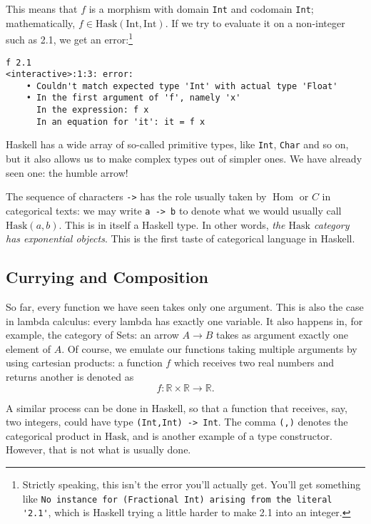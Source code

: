 \documentclass[11pt]{article}
\theoremstyle{nonumberplain}
\newcommand{\R}{\mathbb{R}}
\newcommand{\Hask}{\mathrm{Hask}}
\newcommand{\type}[1]{\mathrm{#1}}
\newcommand{\cat}[1]{\mathrm{#1}}
\DeclareMathOperator{\Hom}{Hom}
\newcommand*\lsin{\lstinline}
\begin{document}
This means that $f$ is a morphism with domain \lstinline|Int| and codomain \lstinline|Int|; mathematically, $f \in \Hask(\type{Int}, \type{Int})$. If we try to evaluate it on a non-integer such as 2.1, we get an error:\footnote{Strictly speaking, this isn't the error you'll actually get. You'll get something like \lstinline|No instance for (Fractional Int) arising from the literal '2.1'|, which is Haskell trying a little harder to make 2.1 into an integer.}
\begin{lstlisting}
f 2.1
<interactive>:1:3: error:
    • Couldn't match expected type 'Int' with actual type 'Float'
    • In the first argument of 'f', namely 'x'
      In the expression: f x
      In an equation for 'it': it = f x
\end{lstlisting}

Haskell has a wide array of so-called primitive types, like \lstinline|Int|, \lstinline|Char| and so on, but it also allows us to make complex types out of simpler ones. We have already seen one: the humble arrow!

The sequence of characters \lstinline|->| has the role usually taken by $\Hom$ or $C$ in categorical texts: we may write \lsin|a -> b| to denote what we would usually call $\Hask(a,b)$. This is in itself a Haskell type. In other words, \emph{the $\Hask$ category has exponential objects}. This is the first taste of categorical language in Haskell.

\subsection{Currying and Composition}

So far, every function we have seen takes only one argument. This is also the case in lambda calculus: every lambda has exactly one variable. It also happens in, for example, the category of $\cat{Sets}$: an arrow $A \to B$ takes as argument exactly one element of $A$. Of course, we emulate our functions taking multiple arguments by using cartesian products: a function $f$ which receives two real numbers and returns another is denoted as
\begin{equation}
f \colon \R \times \R \to \R.
\end{equation}

A similar process can be done in Haskell, so that a function that receives, say, two integers, could have type \lsin|(Int,Int) -> Int|. The comma \lsin|(,)| denotes the categorical product in $\Hask$, and is another example of a type constructor. However, that is not what is usually done.
\end{document}
